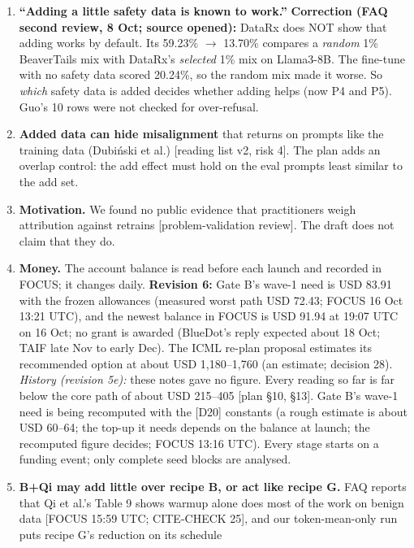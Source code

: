\documentclass{article}
\theoremstyle{plain}
\theoremstyle{definition}
\theoremstyle{remark}
\begin{document}
\begin{enumerate}
  \item \textbf{``Adding a little safety data is known to work.''}
        \textbf{Correction (FAQ second review, 8 Oct; source opened):} DataRx
        does NOT show that adding works by default. Its 59.23\% $\to$ 13.70\%
        compares a \emph{random} 1\% BeaverTails mix with DataRx's
        \emph{selected} 1\% mix on Llama3-8B. The fine-tune with no safety data
        scored 20.24\%, so the random mix made it worse. So \emph{which} safety
        data is added decides whether adding helps (now P4 and P5). Guo's 10
        rows were not checked for over-refusal.
  \item \textbf{Added data can hide misalignment} that returns on prompts like
        the training data (Dubiński et al.) [reading list v2, risk 4]. The plan
        adds an overlap control: the add effect must hold on the eval prompts
        least similar to the add set.
  \item \textbf{Motivation.} We found no public evidence that practitioners
        weigh attribution against retrains [problem-validation review]. The
        draft does not claim that they do.
  \item \textbf{Money.} The account balance is read before each launch and
        recorded in FOCUS; it changes daily. \textbf{Revision 6:} Gate B's
        wave-1 need is USD 83.91 with the frozen allowances (measured worst path
        USD 72.43; FOCUS 16 Oct 13:21 UTC), and the newest balance in FOCUS is
        USD 91.94 at 19:07 UTC on 16 Oct; no grant is awarded (BlueDot's reply
        expected about 18 Oct; TAIF late Nov to early Dec). The ICML re-plan
        proposal estimates its recommended option at about USD 1,180--1,760 (an
        estimate; decision 28). \emph{History (revision 5e):} these notes gave
        no figure. Every reading so far is far below the core path of about USD
        215--405 [plan \S{}10, \S{}13]. Gate B's wave-1 need is being recomputed
        with the [D20] constants (a rough estimate is about USD 60--64; the
        top-up it needs depends on the balance at launch; the recomputed figure
        decides; FOCUS 13:16 UTC). Every stage starts on a funding event; only
        complete seed blocks are analysed.
  \item \textbf{B+Qi may add little over recipe B, or act like recipe G.} FAQ
        reports that Qi et al.'s Table 9 shows warmup alone does most of the
        work on benign data [FOCUS 15:59 UTC; CITE-CHECK 25], and our
        token-mean-only run puts recipe G's reduction on its schedule

\end{enumerate}
\end{document}
